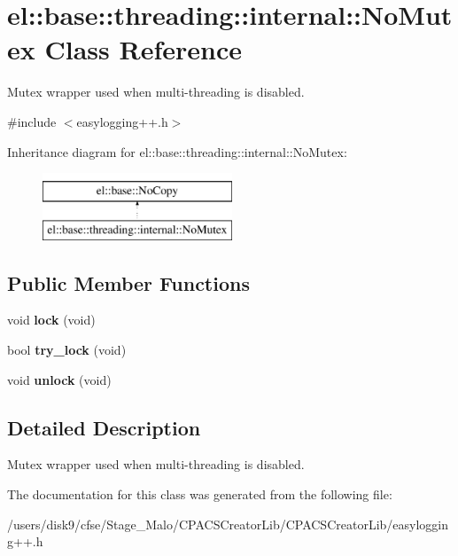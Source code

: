\hypertarget{classel_1_1base_1_1threading_1_1internal_1_1NoMutex}{\section{el\-:\-:base\-:\-:threading\-:\-:internal\-:\-:No\-Mutex Class Reference}
\label{classel_1_1base_1_1threading_1_1internal_1_1NoMutex}
}


Mutex wrapper used when multi-\/threading is disabled.  




{\ttfamily \#include $<$easylogging++.\-h$>$}

Inheritance diagram for el\-:\-:base\-:\-:threading\-:\-:internal\-:\-:No\-Mutex\-:\begin{figure}[H]
\begin{center}
\leavevmode
\includegraphics[height=2.000000cm]{classel_1_1base_1_1threading_1_1internal_1_1NoMutex}
\end{center}
\end{figure}
\subsection*{Public Member Functions}
\begin{DoxyCompactItemize}
\item 
\hypertarget{classel_1_1base_1_1threading_1_1internal_1_1NoMutex_a3b38e4e9411c924daa70d358cf561b3c}{void {\bfseries lock} (void)}\label{classel_1_1base_1_1threading_1_1internal_1_1NoMutex_a3b38e4e9411c924daa70d358cf561b3c}

\item 
\hypertarget{classel_1_1base_1_1threading_1_1internal_1_1NoMutex_a4c0c35a99cf41f26a7608fed5609d6ae}{bool {\bfseries try\-\_\-lock} (void)}\label{classel_1_1base_1_1threading_1_1internal_1_1NoMutex_a4c0c35a99cf41f26a7608fed5609d6ae}

\item 
\hypertarget{classel_1_1base_1_1threading_1_1internal_1_1NoMutex_a5a248c97fee2ef0087526f2f8d3cd26e}{void {\bfseries unlock} (void)}\label{classel_1_1base_1_1threading_1_1internal_1_1NoMutex_a5a248c97fee2ef0087526f2f8d3cd26e}

\end{DoxyCompactItemize}


\subsection{Detailed Description}
Mutex wrapper used when multi-\/threading is disabled. 

The documentation for this class was generated from the following file\-:\begin{DoxyCompactItemize}
\item 
/users/disk9/cfse/\-Stage\-\_\-\-Malo/\-C\-P\-A\-C\-S\-Creator\-Lib/\-C\-P\-A\-C\-S\-Creator\-Lib/easylogging++.\-h\end{DoxyCompactItemize}
